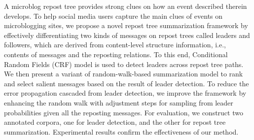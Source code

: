 A microblog repost tree provides strong clues on how an event described therein develops. To help social media users capture the main clues of events on microblogging sites, we propose a novel repost tree summarization framework by effectively differentiating two kinds of messages on repost trees called leaders and followers, which are derived from content-level structure information, i.e., contents of messages and the reposting relations. To this end, Conditional Random Fields (CRF) model is used to detect leaders across repost tree paths. We then present a variant of random-walk-based summarization model to rank and select salient messages based on the result of leader detection. To reduce the error propagation cascaded from leader detection, we improve the framework by enhancing the random walk with adjustment steps for sampling from leader probabilities given all the reposting messages. For evaluation, we construct two annotated corpora, one for leader detection, and the other for repost tree summarization. Experimental results confirm the effectiveness of our method.
